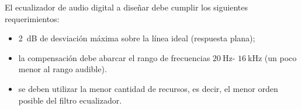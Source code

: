 El ecualizador de audio digital a diseñar debe cumplir los siguientes requerimientos:

\begin{itemize}
	\item \SI{2}{\dB} de desviación máxima sobre la línea ideal (respuesta plana);
	\item la compensación debe abarcar el rango de frecuencias $\SI{20}{\Hz}$- $\SI{16}{\kilo\Hz}$ (un poco menor al rango audible).
	\item se deben utilizar la menor cantidad de recursos, es decir, el menor orden posible del filtro ecualizador.
\end{itemize}
